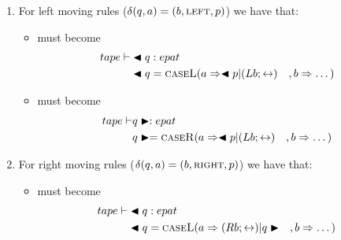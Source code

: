 \documentclass{article}
\begin{document}
	\begin{enumerate}
		\item For left moving rules (\(\delta(q,a) = (b, \textsc{left}, p)\)) we have that: 
		\begin{itemize}
			\item {} must become  
			\begin{align*}
			tape \vdash &\blacktriangleleft q : epat  \\
			&\blacktriangleleft q = \textsc{caseL}( a \Rightarrow \blacktriangleleft p \vert (Lb;\leftrightarrow) \quad, b \Rightarrow \dots )
			\end{align*}
			
			\item {} must become  
			\begin{align*}
			tape \vdash &q \blacktriangleright : epat \\
			&q \blacktriangleright = \textsc{caseR}( a \Rightarrow \blacktriangleleft p \vert (Lb;\leftrightarrow) \quad, b \Rightarrow \dots ) 
			\end{align*}
		\end{itemize}
		\item For right moving rules (\(\delta(q,a) = (b, \textsc{right}, p)\)) we have that:
		\begin{itemize}
			\item {} must become  
			\begin{align*}
			tape \vdash &\blacktriangleleft q : epat \\
			&\blacktriangleleft q = \textsc{caseL}( a \Rightarrow (Rb;\leftrightarrow) \vert q \blacktriangleright \quad, b \Rightarrow \dots ) 
			\end{align*}
			

\end{itemize}
\end{enumerate}
\end{document}
